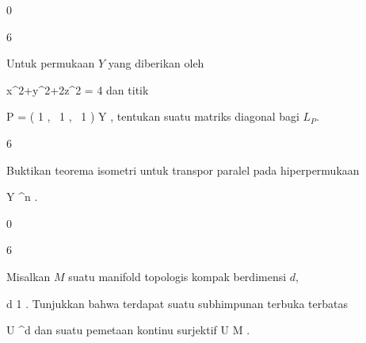 {0}
{

}
{} {}

{6}
{

Untuk permukaan $Y$ yang diberikan oleh

\mavergleichskettedisp
{\vergleichskette
{ x^2+y^2+2z^2
}
{ =} { 4
}
{ } {
}
{ } {
}
{ } {
}
}
{}{}{}
dan titik

\mavergleichskettedisp
{\vergleichskette
{ P
}
{ =} { \left(  1  , \,   1  , \,   1                 \right)
}
{ \in} { Y
}
{ } {
}
{ } {
}
}
{}{}{,}
tentukan suatu matriks diagonal bagi
$L_P$.

}
{} {}

{6}
{

Buktikan teorema isometri untuk transpor paralel pada hiperpermukaan

\mavergleichskette
{\vergleichskette
{ Y
}
{ \subseteq }{ \R^n
}
{  }{
}
{    }{
}
{   }{
}
}
{}{}{.}

}
{} {}

{0}
{

}
{} {}

{6}
{

Misalkan $M$ suatu manifold topologis kompak berdimensi $d$,

\mavergleichskette
{\vergleichskette
{ d
}
{ \geq }{ 1
}
{  }{
}
{    }{
}
{   }{
}
}
{}{}{.}
Tunjukkan bahwa terdapat suatu subhimpunan terbuka terbatas

\mavergleichskette
{\vergleichskette
{ U
}
{ \subseteq }{ \R^d
}
{  }{
}
{    }{
}
{   }{
}
}
{}{}{}
dan suatu pemetaan kontinu surjektif
\maabbdisp {\varphi} { U } { M
} {}
.

}
{} {}

